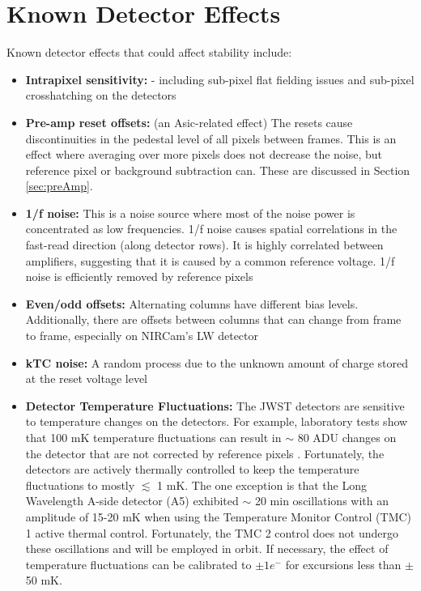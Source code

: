 \documentclass{aastex62}
\begin{document}
\section{Known Detector Effects}\label{sec:knownEffects}

Known detector effects that could affect stability include:
\begin{itemize}[noitemsep]
	\item \textbf{Intrapixel sensitivity:} - including sub-pixel flat fielding issues and sub-pixel crosshatching on the detectors \citep{shapiro2018crosshatch}
	\item \textbf{Pre-amp reset offsets:} (an Asic-related effect) 
The resets cause discontinuities in the pedestal level of all pixels between frames. This is an effect where averaging over more pixels does not decrease the noise, but reference pixel or background subtraction can. These are discussed in Section \ref{sec:preAmp}.
	\item \textbf{1/f noise:} This is a noise source where most of the noise power is concentrated as low frequencies. 1/f noise causes spatial correlations in the fast-read direction (along detector rows). It is highly correlated between amplifiers, suggesting that it is caused by a common reference voltage. 1/f noise is efficiently removed by reference pixels
	\item \textbf{Even/odd offsets:} Alternating columns have different bias levels. Additionally, there are offsets between columns that can change from frame to frame, especially on NIRCam's LW detector
	\item \textbf{kTC noise:} A random process due to the unknown amount of charge stored at the reset voltage level
	\item \textbf{Detector Temperature Fluctuations:} The JWST detectors are sensitive to temperature changes on the detectors. For example, laboratory tests show that 100 mK temperature fluctuations can result in $\sim$ 80 ADU changes on the detector that are not corrected by reference pixels \citep{hall2005jwstArrays}. Fortunately, the detectors are actively thermally controlled to keep the temperature fluctuations to mostly $\lesssim$ 1 mK.
The one exception is that the Long Wavelength A-side detector (A5) exhibited $\sim$ 20 min oscillations with an amplitude of 15-20 mK when using the Temperature Monitor Control (TMC) 1 active thermal control.
Fortunately, the TMC 2 control does not undergo these oscillations and will be employed in orbit.
If necessary, the effect of temperature fluctuations can be calibrated to $\pm 1 e^-$ for excursions less than $\pm$ 50 mK.

\end{itemize}
\end{document}
